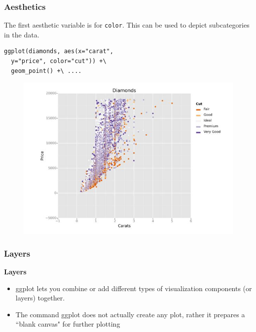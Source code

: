 \documentclass{beamer}
\begin{document}
\begin{frame}[fragile]
	\frametitle{Aesthetics}
	\Large
The first aesthetic variable is for \texttt{color}. This can be used to depict subcategories in the data.
	\begin{framed}
		\begin{verbatim}
ggplot(diamonds, aes(x="carat", 
  y="price", color="cut")) +\
  geom_point() +\ ....
	\end{verbatim}
\end{framed}

\end{frame}
\begin{frame}
	
	\begin{figure}
\centering
\includegraphics[width=1.1\linewidth]{aesthetic2}
\end{figure}

\end{frame}
\begin{frame}[fragile]
	\frametitle{Layers}
	\Large
	\noindent \textbf{Layers}
	\begin{itemize}
		\item ggplot lets you combine or add different types of visualization components (or layers) together. 
		\item The command ggplot does not actually create any plot, rather it prepares a ``blank canvas" for further plotting 
	\end{itemize}
	
\end{frame}
\end{document}
